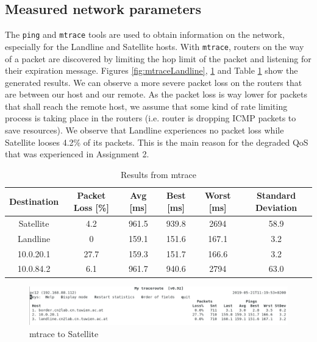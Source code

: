 \documentclass[parskip=full]{scrartcl}
\begin{document}
\subsection{Measured network parameters}

The \texttt{ping} and \texttt{mtrace} tools are used to obtain information on the network, especially for the Landline and Satellite hosts.
With \texttt{mtrace}, routers on the way of a packet are discovered by limiting the hop limit of the packet and listening for their expiration message.
Figures \ref{fig:mtraceLandline}, \ref{fig:mtraceSatellite} and Table \ref{tbl:mtraceResults} show the generated results.
We can observe a more severe packet loss on the routers that are between our host and our remote. 
As the packet loss is way lower for packets that shall reach the remote host, we assume that some kind of rate limiting process is taking place in the routers (i.e. router is dropping ICMP packets to save resources).
We observe that Landline experiences no packet loss while Satellite looses 4.2\% of its packets. 
This is the main reason for the degraded QoS that was experienced in Assignment 2.

\begin{table}[hb]
    \centering
    \caption{Results from mtrace}
    \label{tbl:mtraceResults}
    \begin{tabular}{cccccc}
        \toprule
        Destination & Packet Loss [\%] & Avg [ms] & Best [ms] & Worst [ms] & Standard Deviation  \\ \midrule
        Satellite & 4.2 & 961.5 & 939.8 & 2694 & 58.9 \\
        Landline & 0 & 159.1 & 151.6 & 167.1 & 3.2\\
        10.0.20.1 & 27.7 & 159.3 & 151.7 & 166.6 & 3.2\\
        10.0.84.2 & 6.1 & 961.7 & 940.6 & 2794 & 63.0\\
        \bottomrule
    \end{tabular}
\end{table}

\begin{figure}[ht]
    \centering
   \includegraphics[width=\textwidth]{images/mytraceroute1.png} 
    \caption{mtrace to Satellite}
    \label{fig:mtraceSatellite}
\end{figure}
\end{document}
